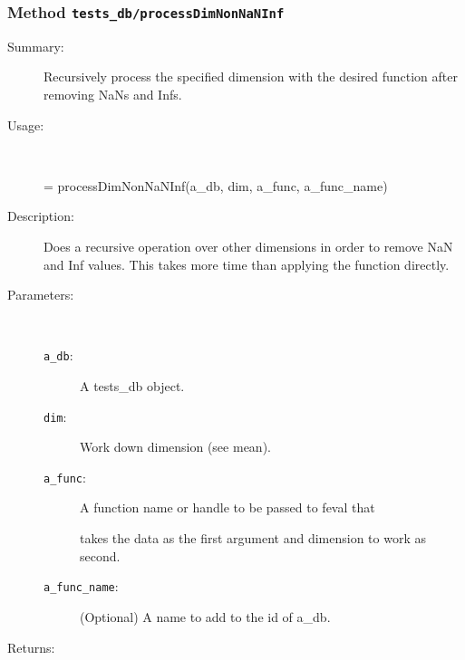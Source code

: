\subsubsection[Method \texttt{processDimNonNaNInf}]{Method \texttt{tests\_db/processDimNonNaNInf}}%
%
\label{ref_tests_db__processDimNonNaNInf}%
\hypertarget{ref_tests_db__processDimNonNaNInf}{}%
\begin{description}
\item[Summary:]Recursively process the specified dimension with the desired function after removing NaNs and Infs.
%
\item[Usage:]~%
\begin{lyxcode}%
[a\_db, n, i] = processDimNonNaNInf(a\_db, dim, a\_func, a\_func\_name)
%
\end{lyxcode}%
%
\item[Description:]%
Does a recursive operation over other dimensions in order to remove
 NaN and Inf values. This takes more time than applying the function directly. 
\item[Parameters:]~
\begin{description}%
\item[\texttt{a\_db}:]
 A tests\_db object.
\item[\texttt{dim}:]
 Work down dimension (see mean).
\item[\texttt{a\_func}:]
 A function name or handle to be passed to feval that

takes the data as the first argument and dimension to
work as second.
\item[\texttt{a\_func\_name}:]
 (Optional) A name to add to the id of a\_db.
\end{description}%
%
\item[Returns:
]~


\end{description}
